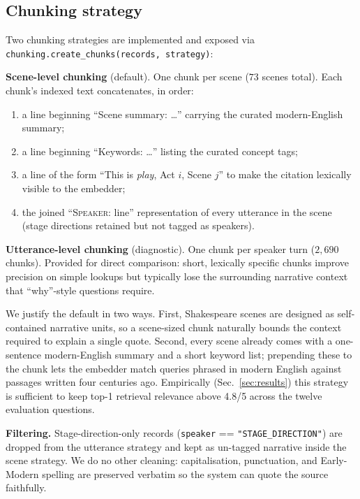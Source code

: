 \documentclass[10pt,twocolumn,a4paper]{article}
\begin{document}
\subsection{Chunking strategy}

Two chunking strategies are implemented and exposed via
\verb|chunking.create_chunks(records, strategy)|:

\textbf{Scene-level chunking} (default). One chunk per scene
($73$ scenes total). Each chunk's indexed text concatenates, in order:

\begin{enumerate}
    \item a line beginning ``Scene summary: \ldots'' carrying the
        curated modern-English summary;
    \item a line beginning ``Keywords: \ldots'' listing the curated
        concept tags;
    \item a line of the form ``This is \emph{play}, Act $i$, Scene $j$''
        to make the citation lexically visible to the embedder;
    \item the joined ``\textsc{Speaker}: line'' representation of every
        utterance in the scene (stage directions retained but not
        tagged as speakers).
\end{enumerate}

\textbf{Utterance-level chunking} (diagnostic). One chunk per speaker
turn ($2{,}690$ chunks). Provided for direct comparison: short, lexically
specific chunks improve precision on simple lookups but typically lose
the surrounding narrative context that ``why''-style questions require.

We justify the default in two ways. First, Shakespeare scenes are
designed as self-contained narrative units, so a scene-sized chunk
naturally bounds the context required to explain a single quote.
Second, every scene already comes with a one-sentence modern-English
summary and a short keyword list; prepending these to the chunk lets
the embedder match queries phrased in modern English against passages
written four centuries ago. Empirically (Sec.~\ref{sec:results}) this
strategy is sufficient to keep top-1 retrieval relevance above 4.8/5
across the twelve evaluation questions.

\textbf{Filtering.} Stage-direction-only records (\verb|speaker| ==
\verb|"STAGE_DIRECTION"|) are dropped from the utterance strategy and
kept as un-tagged narrative inside the scene strategy. We do no other
cleaning: capitalisation, punctuation, and Early-Modern spelling are
preserved verbatim so the system can quote the source faithfully.
\end{document}
